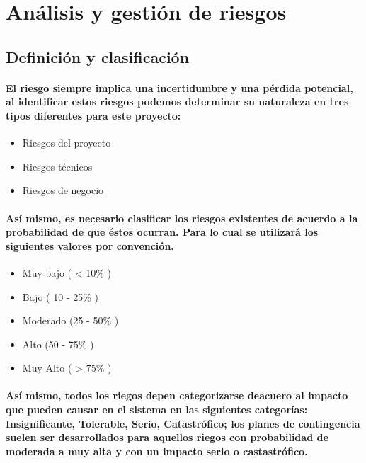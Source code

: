 \section{Análisis y gestión de riesgos}
  \subsection{Definición y clasificación}
    \paragraph{El riesgo siempre implica una incertidumbre y una pérdida potencial, al identificar estos riesgos podemos determinar su naturaleza en tres tipos diferentes para este proyecto:}
    \begin{itemize}
      \item Riesgos del proyecto
      \item Riesgos técnicos
      \item Riesgos de negocio
    \end{itemize}
    \paragraph{Así mismo, es necesario clasificar los riesgos existentes de acuerdo  a la probabilidad de que éstos ocurran. Para lo cual se utilizará los siguientes valores por convención.}
    \begin{itemize}
      \item Muy bajo ( < 10\% )
      \item Bajo ( 10 - 25\% )
      \item Moderado (25 - 50\% )
      \item Alto (50 - 75\% )
      \item Muy Alto ( > 75\% )
    \end{itemize}
    \paragraph{Así mismo, todos los riegos depen categorizarse deacuero al impacto que pueden causar en el sistema en las siguientes categorías: Insignificante, Tolerable, Serio, Catastrófico; los planes de contingencia suelen ser desarrollados para aquellos riegos con probabilidad de moderada a muy alta y con un impacto serio o castastrófico.}
